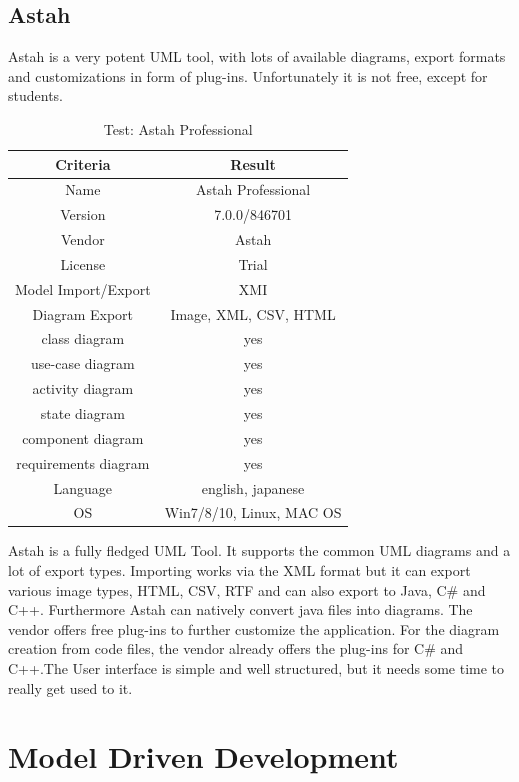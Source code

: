 \subsection{Astah}
 Astah is a very potent UML tool, with lots of available diagrams, export formats and customizations in form of plug-ins. Unfortunately it is not free, except for students. 
\begin{table}[htbp]
\centering
\begin{tabular}{c|c}
\hline \hline 
Criteria & Result \\ \hline \hline
Name & Astah Professional \\ \hline
Version & 7.0.0/846701 \\ \hline
Vendor & Astah \\ \hline
License & Trial \\ \hline
Model Import/Export & XMI \\ \hline
Diagram Export & Image, XML, CSV, HTML \\ \hline
class diagram & yes \\ \hline
use-case diagram & yes \\ \hline
activity diagram & yes \\ \hline
state diagram & yes \\ \hline
component diagram & yes \\ \hline
requirements diagram & yes \\ \hline
Language & english, japanese  \\ \hline
OS & Win7/8/10, Linux, MAC OS \\ \hline \hline
\end{tabular}
\caption{Test: Astah Professional}
\label{tab:ea}
\end{table}
Astah is a fully fledged UML Tool. It supports the common UML diagrams and a lot of export types. Importing works via the XML format but it can export various image types, HTML, CSV, RTF and can also export to Java, C\# and C++.  Furthermore Astah can natively convert java files into diagrams. The vendor offers free plug-ins to further customize the application.  For the diagram creation from code files, the vendor already offers the plug-ins for C\# and C++.The User interface is simple and well structured, but it needs some time to really get used to it.
\pagebreak
\pagebreak
\section{Model Driven Development}

